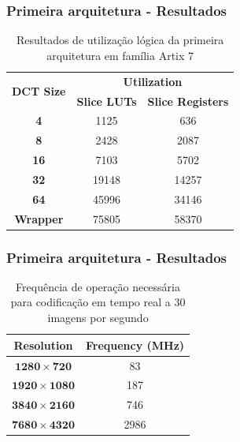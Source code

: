 \documentclass{beamer}
\begin{document}
\begin{frame}
       \frametitle{Primeira arquitetura - Resultados}
              \begin{table}[h]
                     \centering
                     \caption{Resultados de utilização lógica da primeira arquitetura em família Artix 7}
                     \begin{tabular}{ccc} \toprule
                            \multirow{2}{*}{\textbf{DCT Size}} &     \multicolumn{2}{c}{\textbf{Utilization}} \\
                            &      \textbf{Slice LUTs} &      \textbf{Slice Registers} \\ \toprule
                            \textbf{4} &    1125  &       636  \\ \hline
                            \textbf{8} &    2428  &       2087  \\ \hline
                            \textbf{16} &   7103  &      5702  \\ \hline
                            \textbf{32} &   19148  &     14257  \\ \hline
                            \textbf{64} &   45996  &    34146  \\ \bottomrule        
                            \textbf{Wrapper} & 75805  & 58370  \\
                            \bottomrule
                     \end{tabular}    
                     \label{tab:v1results}
              \end{table}
\end{frame}

\begin{frame}
       \frametitle{Primeira arquitetura - Resultados}
              \begin{table}[h]
                     \centering
                     \caption{Frequência de operação necessária para codificação em tempo real a 30 imagens por segundo}
                     \begin{tabular}{cc} \toprule
                            \textbf{Resolution}         & \textbf{Frequency (MHz)} \\ \toprule
                            $\mathbf{1280\times 720}$   & 83 \\
                            $\mathbf{1920\times 1080}$  & 187 \\
                            $\mathbf{3840\times 2160}$  & 746 \\
                            $\mathbf{7680\times 4320}$  & 2986 \\
                            \bottomrule
                     \end{tabular}    
                     \label{tab:freq30}
              \end{table}
\end{frame}
\end{document}

